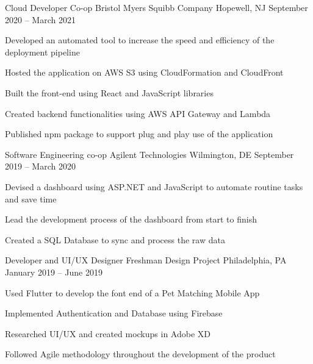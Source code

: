 

\begin{cventries}

  
	\cventry
	{Cloud Developer Co-op}
	{Bristol Myers Squibb Company}
	{Hopewell, NJ}
	{September 2020 – March 2021}
	{\begin{cvitems}
		\item {Developed an automated tool to increase the speed and efficiency of the deployment pipeline}
        \item {Hosted the application on AWS S3 using CloudFormation and CloudFront}
        \item {Built the front-end using React and JavaScript libraries}
        \item {Created backend functionalities using AWS API Gateway and Lambda}
        \item {Published npm package to support plug and play use of the application}
		\end{cvitems}}
	
	\vspace{-2mm}
	\cventry
	{Software Engineering co-op}
	{Agilent Technologies}
	{Wilmington, DE}
	{September 2019 – March 2020}
	{\begin{cvitems}
	    \item {Devised a dashboard using ASP.NET and JavaScript to automate routine tasks and save time}
        \item {Lead the development process of the dashboard from start to finish}
        \item {Created a SQL Database to sync and process the raw data}
		\end{cvitems}}
	
	\vspace{-2mm}
	\cventry
	{Developer and UI/UX Designer}
	{Freshman Design Project}
	{Philadelphia, PA}
	{January 2019 – June 2019}
	{\begin{cvitems}
		\item {Used Flutter to develop the font end of a Pet Matching Mobile App}
		\item {Implemented Authentication and Database using Firebase}
		\item {Researched UI/UX and created mockups in Adobe XD}
		\item {Followed Agile methodology throughout the development of the product}
		\end{cvitems}}
	

\end{cventries}
